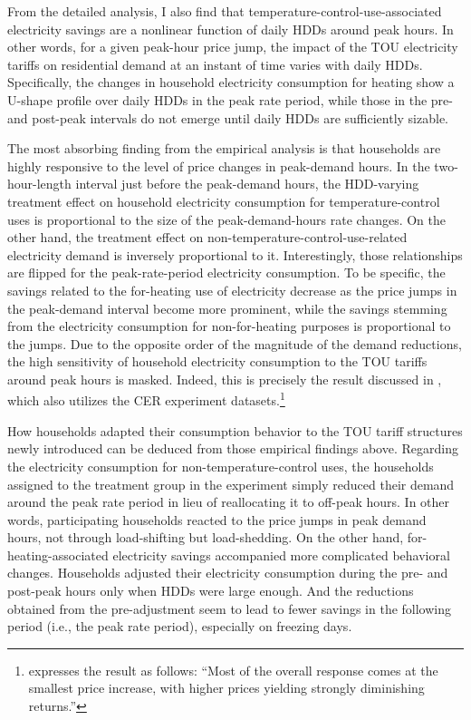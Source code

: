 From the detailed analysis, I also find that temperature-control-use-associated electricity savings are a nonlinear function of daily HDDs around peak hours. In other words, for a given peak-hour price jump, the impact of the TOU electricity tariffs on residential demand at an instant of time varies with daily HDDs. Specifically, the changes in household electricity consumption for heating show a U-shape profile over daily HDDs in the peak rate period, while those in the pre- and post-peak intervals do not emerge until daily HDDs are sufficiently sizable. 

The most absorbing finding from the empirical analysis is that households are highly responsive to the level of price changes in peak-demand hours. In the two-hour-length interval just before the peak-demand hours, the HDD-varying treatment effect on household electricity consumption for temperature-control uses is proportional to the size of the peak-demand-hours rate changes. On the other hand, the treatment effect on non-temperature-control-use-related electricity demand is inversely proportional to it. Interestingly, those relationships are flipped for the peak-rate-period electricity consumption. To be specific, the savings related to the for-heating use of electricity decrease as the price jumps in the peak-demand interval become more prominent, while the savings stemming from the electricity consumption for non-for-heating purposes is proportional to the jumps. Due to the opposite order of the magnitude of the demand reductions, the high sensitivity of household electricity consumption to the TOU tariffs around peak hours is masked. Indeed, this is precisely the result discussed in \cite{Peaking-Interest:How-Awareness-Drives-the-Effectiveness-of-Time-of-Use-Electricity-Pricing_Prest_2020}, which also utilizes the CER experiment datasets.\footnote{\cite{Peaking-Interest:How-Awareness-Drives-the-Effectiveness-of-Time-of-Use-Electricity-Pricing_Prest_2020} expresses the result as follows: ``Most of the overall response comes at the smallest price increase, with higher prices yielding strongly diminishing returns.''}

How households adapted their consumption behavior to the TOU tariff structures newly introduced can be deduced from those empirical findings above. Regarding the electricity consumption for non-temperature-control uses, the households assigned to the treatment group in the experiment simply reduced their demand around the peak rate period in lieu of reallocating it to off-peak hours. In other words, participating households reacted to the price jumps in peak demand hours, not through load-shifting but load-shedding. On the other hand, for-heating-associated electricity savings accompanied more complicated behavioral changes. Households adjusted their electricity consumption during the pre- and post-peak hours only when HDDs were large enough. And the reductions obtained from the pre-adjustment seem to lead to fewer savings in the following period (i.e., the peak rate period), especially on freezing days. 

